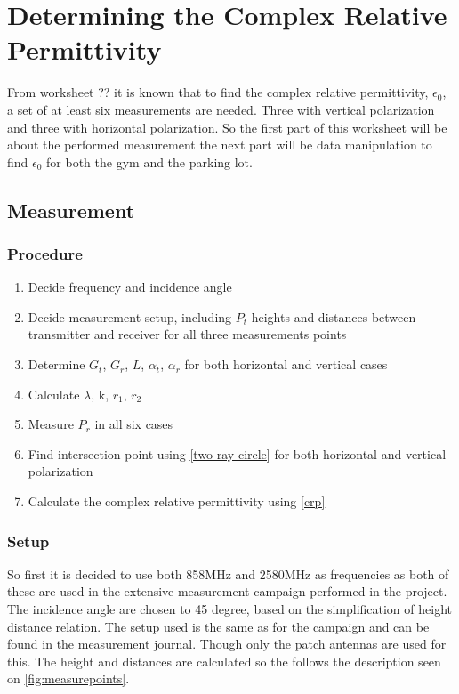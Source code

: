 \chapter{Determining the Complex Relative Permittivity}


From worksheet ?? it is known that to find the complex relative permittivity, $\epsilon_0$, a set of at least six measurements are needed. Three with vertical polarization and three with horizontal polarization. So the first part of this worksheet will be about the performed measurement the next part will be data manipulation to find $\epsilon_0$ for both the gym and the parking lot.

\section{Measurement}
\subsection{Procedure}
\begin{enumerate}
	\item Decide frequency and incidence angle
	\item Decide measurement setup, including $P_t$ heights and distances between transmitter and receiver for all three measurements points
	\item Determine $G_t$, $G_r$, $L$, $\alpha_t$, $\alpha_r$ for both horizontal and vertical cases
	\item Calculate $\lambda$, k, $r_1$, $r_2$
	\item Measure $P_r$ in all six cases
	\item Find intersection point using \autoref{two-ray-circle} for both horizontal and vertical polarization
	\item Calculate the complex relative permittivity using \autoref{crp}
\end{enumerate}

\subsection{Setup}
So first it is decided to use both 858MHz and 2580MHz as frequencies as both of these are used in the extensive measurement campaign performed in the project. The incidence angle are chosen to 45 degree, based on the simplification of height distance relation. 
The setup used is the same as for the campaign and can be found in the measurement journal. Though only the patch antennas are used for this. The height and distances are calculated so the follows the description seen on \autoref{fig:measurepoints}. 

